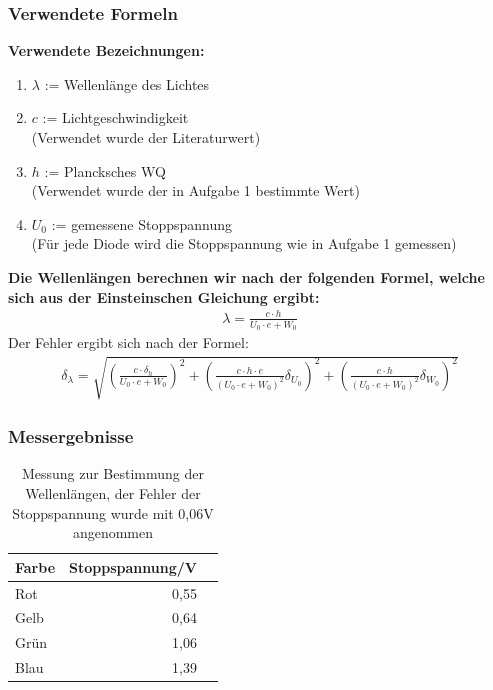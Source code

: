 \documentclass[12px]{scrartcl}
\begin{document}
\subsubsection{Verwendete Formeln}
\textbf{Verwendete Bezeichnungen:}
\begin{enumerate}
\item $\lambda$ := Wellenlänge des Lichtes
\item $c$ := Lichtgeschwindigkeit\\
(Verwendet wurde der Literaturwert)
\item $h$ := Plancksches WQ\\
(Verwendet wurde der in Aufgabe 1 bestimmte Wert)
\item $U_0$ := gemessene Stoppspannung\\
(Für jede Diode wird die Stoppspannung wie in Aufgabe 1 gemessen)
\end{enumerate}
\textbf{Die Wellenlängen berechnen wir nach der folgenden Formel, welche sich aus der Einsteinschen Gleichung ergibt:}
\begin{align}
\lambda = \frac{c \cdot h}{U_0\cdot e + W_0}
\label{eqn:lambda}
\end{align}
Der Fehler ergibt sich nach der Formel:
\begin{align}
\delta_{\lambda} = \sqrt{
\left(\frac{c \cdot\delta_h}{U_0\cdot e + W_0}\right)^2+
\left(\frac{c \cdot h \cdot e}{(U_0\cdot e + W_0)^2}\delta_{U_0}\right)^2+
\left(\frac{c \cdot h}{(U_0\cdot e + W_0)^2}\delta_{W_0}\right)^2}
\label{eqn:lambda_delta}
\end{align}


\subsubsection{Messergebnisse}
\begin{table}[H]
\caption{Messung zur Bestimmung der Wellenlängen, der Fehler der Stoppspannung wurde mit 0,06V angenommen}
\begin{center}
\begin{tabular}{|l|r|r|}
\hline
Farbe & \multicolumn{1}{l|}{Stoppspannung/V} \\ \hline
Rot & 0,55 \\ \hline
Gelb & 0,64 \\ \hline
Grün & 1,06 \\ \hline
Blau & 1,39 \\ \hline
\end{tabular}
\end{center}
\label{tab:a_2.2}
\end{table}
\end{document}
